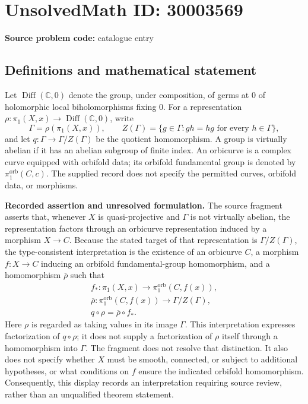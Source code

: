 \documentclass[11pt]{article}
\newcommand{\C}{\mathbb{C}}
\begin{document}
\section*{UnsolvedMath ID: 30003569}
\textbf{Source problem code:} catalogue entry
\subsection{Definitions and mathematical statement}
Let \(\operatorname{Diff}(\C,0)\) denote the group, under composition, of germs at \(0\) of holomorphic local biholomorphisms fixing \(0\). For a representation \(\rho:\pi_1(X,x)\to\operatorname{Diff}(\C,0)\), write
\[
\Gamma=\rho(\pi_1(X,x)),\qquad Z(\Gamma)=\{g\in\Gamma:gh=hg\text{ for every }h\in\Gamma\},
\]
and let \(q:\Gamma\to\Gamma/Z(\Gamma)\) be the quotient homomorphism. A group is virtually abelian if it has an abelian subgroup of finite index. An orbicurve is a complex curve equipped with orbifold data; its orbifold fundamental group is denoted by \(\pi_1^{\mathrm{orb}}(C,c)\). The supplied record does not specify the permitted curves, orbifold data, or morphisms.

\textbf{Recorded assertion and unresolved formulation.} The source fragment asserts that, whenever \(X\) is quasi-projective and \(\Gamma\) is not virtually abelian, the representation factors through an orbicurve representation induced by a morphism \(X\to C\). Because the stated target of that representation is \(\Gamma/Z(\Gamma)\), the type-consistent interpretation is the existence of an orbicurve \(C\), a morphism \(f:X\to C\) inducing an orbifold fundamental-group homomorphism, and a homomorphism \(\overline\rho\) such that
\[
\begin{gathered}
f_*:\pi_1(X,x)\longrightarrow\pi_1^{\mathrm{orb}}(C,f(x)),\\
\overline\rho:\pi_1^{\mathrm{orb}}(C,f(x))\longrightarrow\Gamma/Z(\Gamma),\\
q\circ\rho=\overline\rho\circ f_*.
\end{gathered}
\]
Here \(\rho\) is regarded as taking values in its image \(\Gamma\). This interpretation expresses factorization of \(q\circ\rho\); it does not supply a factorization of \(\rho\) itself through a homomorphism into \(\Gamma\). The fragment does not resolve that distinction. It also does not specify whether \(X\) must be smooth, connected, or subject to additional hypotheses, or what conditions on \(f\) ensure the indicated orbifold homomorphism. Consequently, this display records an interpretation requiring source review, rather than an unqualified theorem statement.
\end{document}
